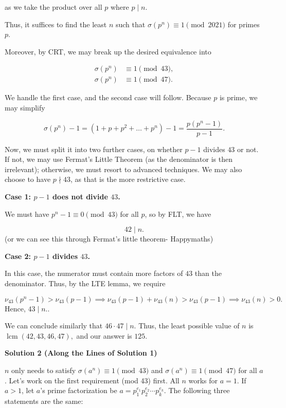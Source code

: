 \begin{enumerate}
 as we take the product over all $p$ where $p\mid n$.

 Thus, it suffices to find the least $n$ such that $\sigma(p^n)\equiv 1\pmod{2021}$ for primes $p$.

 Moreover, by CRT, we may break up the desired equivalence into

 \begin{align*}\sigma(p^n) &\equiv 1 \pmod{43},\\\sigma(p^n) &\equiv 1 \pmod{47}.\end{align*}


 We handle the first case, and the second case will follow. Because $p$ is prime, we may simplify

 
 \[\sigma(p^n)-1 = (1+p+p^2+\dots+p^n)-1 = \frac{p(p^n-1)}{p-1}.\]

 Now, we must split it into two further cases, on whether $p-1$ divides $43$ or not. If not, we may use Fermat's Little Theorem (as the denominator is then irrelevant); otherwise, we must resort to advanced techniques. We may also choose to have $p\nmid 43$, as that is the more restrictive case.

 \textbf{Case 1: $p-1$ does not divide $43$.}

 We must have $p^n-1\equiv 0\pmod{43}$ for all $p$, so by FLT, we have

 
 \[42\mid n.\](or we can see this through Fermat's little theorem- Happymaths)

 \textbf{Case 2: $p-1$ divides $43$.}

 In this case, the numerator must contain more factors of $43$ than the denominator. Thus, by the LTE lemma, we require

 
 \[\nu_{43}(p^n-1) > \nu_{43}(p-1) \implies \nu_{43}(p-1)+\nu_{43}(n) > \nu_{43}(p-1) \implies \nu_{43}(n) > 0.\]Hence, $43\mid n.$.

 We can conclude similarly that $46\cdot 47\mid n$. Thus, the least possible value of $n$ is $\operatorname{lcm}(42,43,46,47),$ and our answer is $\boxed{125}.$




\textbf{Solution 2 (Along the Lines of Solution 1)}

$n$ only needs to satisfy $\sigma(a^n)\equiv 1 \pmod{43}$ and $\sigma(a^n)\equiv 1 \pmod{47}$ for all $a$. Let's work on the first requirement (mod 43) first. All $n$ works for $a=1$. If $a>1$, let $a$'s prime factorization be $a=p_1^{e_1}p_2^{e_2}\cdots p_k^{e_k}$. The following three statements are the same:


\end{enumerate}
